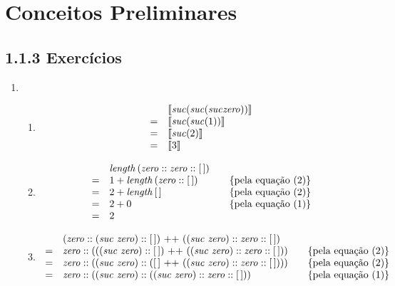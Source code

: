\section{Conceitos Preliminares}

\subsection{1.1.3 Exerc\'icios}

	\begin{enumerate}
	  \item 
	  
	  \begin{enumerate}
	    \item 
	    \[ 
	    \begin{array}{ll}  
	    & \llbracket \textit{suc\/} (\textit{suc\/} (\textit{suc\/} \textit{zero\/})) \rrbracket\\
	    = & \llbracket \textit{suc\/} (\textit{suc\/} (1)) \rrbracket \\
	    = & \llbracket \textit{suc\/} (2) \rrbracket \\
	    = & \llbracket 3 \rrbracket \\ 
	    \end{array}
	    \]
	    
	    \item
	    \[
	    \begin{array}{llcl}
	    & \length\,(\zero ::\zero :: [\,])& & \\
	    = &1 + \length \,(\zero :: [\,]) & & \{\text{pela equa\c{c}\~ao }(2)\}\\
	    = &2 + \length \,[\,] & & \{\text{pela equa\c{c}\~ao }(2)\}\\
	    = &2 + 0 & & \{\text{pela equa\c{c}\~ao }(1)\}\\
	    = &2
	    \end{array}
	    \]
	    
	    \item
	    \[
	    \begin{array}{llcl}    
	    & (\zero :: (\suc\,\,\zero) :: [\,]) \text{ ++ } ((\suc\,\,\zero) :: \zero :: [\,]) & & \\
	    = & \zero :: (((\suc\,\,\zero) :: [\,]) \text{ ++ } ((\suc\,\,\zero) :: \zero::[\,])) & & \{\text{pela equa\c{c}\~ao }(2)\}\\
	    = & \zero :: ((\suc\,\,\zero) :: ( [\,] \text{ ++ } ((\suc\,\,\zero) :: \zero::[\,]))) & & \{\text{pela equa\c{c}\~ao }(2)\}\\
	    = & \zero :: ((\suc\,\,\zero) :: ((\suc\,\,\zero) :: \zero::[\,])) & & \{\text{pela equa\c{c}\~ao }(1)\}\\
	    \end{array}
	    \]
	  \end{enumerate}
	  

\end{enumerate}
